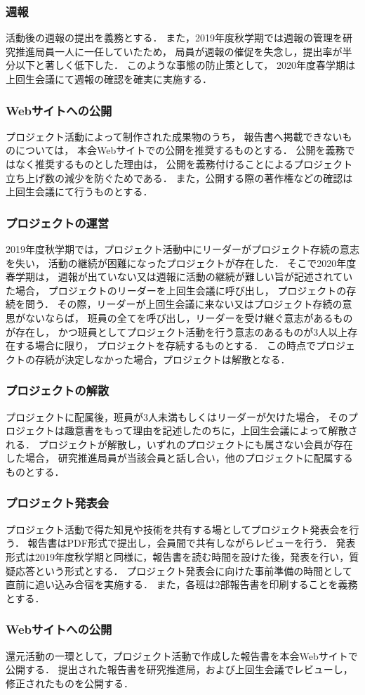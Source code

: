 \subsubsection*{週報}
活動後の週報の提出を義務とする．
また，2019年度秋学期では週報の管理を研究推進局員一人に一任していたため，
局員が週報の催促を失念し，提出率が半分以下と著しく低下した．
このような事態の防止策として，
2020年度春学期は上回生会議にて週報の確認を確実に実施する．

\subsubsection*{Webサイトへの公開}
プロジェクト活動によって制作された成果物のうち，
報告書へ掲載できないものについては，
本会Webサイトでの公開を推奨するものとする．
公開を義務ではなく推奨するものとした理由は，
公開を義務付けることによるプロジェクト立ち上げ数の減少を防ぐためである．
また，公開する際の著作権などの確認は上回生会議にて行うものとする．


\subsubsection*{プロジェクトの運営}
2019年度秋学期では，プロジェクト活動中にリーダーがプロジェクト存続の意志を失い，
活動の継続が困難になったプロジェクトが存在した．
そこで2020年度春学期は，
週報が出ていない又は週報に活動の継続が難しい旨が記述されていた場合，
プロジェクトのリーダーを上回生会議に呼び出し，
プロジェクトの存続を問う．
その際，リーダーが上回生会議に来ない又はプロジェクト存続の意思がないならば，
班員の全てを呼び出し，リーダーを受け継ぐ意志があるものが存在し，
かつ班員としてプロジェクト活動を行う意志のあるものが3人以上存在する場合に限り，
プロジェクトを存続するものとする．
この時点でプロジェクトの存続が決定しなかった場合，プロジェクトは解散となる．

\subsubsection*{プロジェクトの解散}
プロジェクトに配属後，班員が3人未満もしくはリーダーが欠けた場合，
そのプロジェクトは趣意書をもって理由を記述したのちに，上回生会議によって解散される．
プロジェクトが解散し，いずれのプロジェクトにも属さない会員が存在した場合，
研究推進局員が当該会員と話し合い，他のプロジェクトに配属するものとする．

\subsubsection*{プロジェクト発表会}
プロジェクト活動で得た知見や技術を共有する場としてプロジェクト発表会を行う．
報告書はPDF形式で提出し，会員間で共有しながらレビューを行う．
発表形式は2019年度秋学期と同様に，報告書を読む時間を設けた後，発表を行い，質疑応答という形式とする．
プロジェクト発表会に向けた事前準備の時間として直前に追い込み合宿を実施する．
また，各班は2部報告書を印刷することを義務とする．

\subsubsection*{Webサイトへの公開}
還元活動の一環として，プロジェクト活動で作成した報告書を本会Webサイトで公開する．
提出された報告書を研究推進局，および上回生会議でレビューし，修正されたものを公開する．

